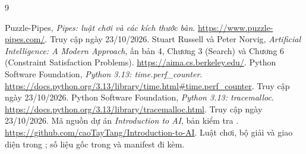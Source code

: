 \begin{thebibliography}{9}
\raggedright
{}
 Puzzle-Pipes, \emph{Pipes: luật chơi và các kích thước bàn}.
\url{https://www.puzzle-pipes.com/}. Truy cập ngày 23/10/2026.
 Stuart Russell và Peter Norvig, \emph{Artificial Intelligence:
A Modern Approach}, ấn bản 4, Chương 3 (Search) và Chương 6 (Constraint
Satisfaction Problems). \url{https://aima.cs.berkeley.edu/}.
 Python Software Foundation, \emph{Python 3.13:
time.perf\_counter}. \url{https://docs.python.org/3.13/library/time.html#time.perf_counter}.
Truy cập ngày 23/10/2026.
 Python Software Foundation, \emph{Python 3.13:
tracemalloc}. \url{https://docs.python.org/3.13/library/tracemalloc.html}.
Truy cập ngày 23/10/2026.
 Mã nguồn dự án \emph{Introduction to AI}, bản kiểm tra
. \url{https://github.com/caoTayTang/Introduction-to-AI}.
Luật chơi, bộ giải và giao diện trong ; số liệu gốc
trong  và manifest đi kèm.
\end{thebibliography}
